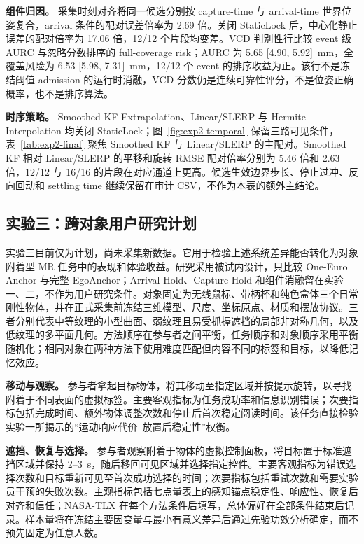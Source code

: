 \documentclass[review]{vgtc}
\begin{document}


\textbf{组件归因。} 采集时刻对齐将同一候选分别按 capture-time 与 arrival-time 世界位姿复合，arrival 条件的配对误差倍率为 2.69 倍。关闭 StaticLock 后，中心化静止误差的配对倍率为 17.06 倍，12/12 个片段均变差。VCD 判别性行比较 event 级 AURC 与忽略分数排序的 full-coverage risk；AURC 为 5.65 [4.90, 5.92]~mm，全覆盖风险为 6.53 [5.98, 7.31]~mm，12/12 个 event 的排序收益为正。该行不是冻结阈值 admission 的运行时消融，VCD 分数仍是连续可靠性评分，不是位姿正确概率，也不是排序算法。

\textbf{时序策略。} Smoothed KF Extrapolation、Linear/SLERP 与 Hermite Interpolation 均关闭 StaticLock；图~\ref{fig:exp2-temporal} 保留三路可见条件，表~\ref{tab:exp2-final} 聚焦 Smoothed KF 与 Linear/SLERP 的主配对。Smoothed KF 相对 Linear/SLERP 的平移和旋转 RMSE 配对倍率分别为 5.46 倍和 2.63 倍，12/12 与 16/16 的片段在对应通道上更高。候选生效边界步长、停止过冲、反向回动和 settling time 继续保留在审计 CSV，不作为本表的额外主结论。

\subsection{实验三：跨对象用户研究计划}

实验三目前仅为计划，尚未采集新数据。它用于检验上述系统差异能否转化为对象附着型 MR 任务中的表现和体验收益。研究采用被试内设计，只比较 One-Euro Anchor 与完整 EgoAnchor；Arrival-Hold、Capture-Hold 和组件消融留在实验一、二，不作为用户研究条件。对象固定为无线鼠标、带柄杯和纯色盒体三个日常刚性物体，并在正式采集前冻结三维模型、尺度、坐标原点、材质和摆放协议。三者分别代表中等纹理的小型曲面、弱纹理且易受抓握遮挡的局部非对称几何，以及低纹理的多平面几何。方法顺序在参与者之间平衡，任务顺序和对象顺序采用平衡随机化；相同对象在两种方法下使用难度匹配但内容不同的标签和目标，以降低记忆效应。

\textbf{移动与观察。} 参与者拿起目标物体，将其移动至指定区域并按提示旋转，以寻找附着于不同表面的虚拟标签。主要客观指标为任务成功率和信息识别错误；次要指标包括完成时间、额外物体调整次数和停止后首次稳定阅读时间。该任务直接检验实验一所揭示的“运动响应代价--放置后稳定性”权衡。

\textbf{遮挡、恢复与选择。} 参与者观察附着于物体的虚拟控制面板，将目标置于标准遮挡区域并保持 2--3~s，随后移回可见区域并选择指定控件。主要客观指标为错误选择次数和目标重新可见至首次成功选择的时间；次要指标包括重试次数和需要实验员干预的失败次数。主观指标包括七点量表上的感知锚点稳定性、响应性、恢复后对齐和信任；NASA-TLX 在每个方法条件后填写，总体偏好在全部条件结束后记录。样本量将在冻结主要因变量与最小有意义差异后通过先验功效分析确定，而不预先固定为任意人数。
\end{document}

